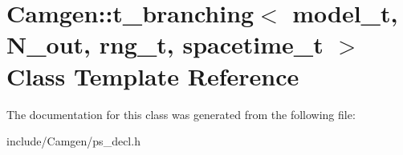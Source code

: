 \hypertarget{a00523}{\section{Camgen\-:\-:t\-\_\-branching$<$ model\-\_\-t, N\-\_\-out, rng\-\_\-t, spacetime\-\_\-t $>$ Class Template Reference}
\label{a00523}
}


The documentation for this class was generated from the following file\-:\begin{DoxyCompactItemize}
\item 
include/\-Camgen/ps\-\_\-decl.\-h\end{DoxyCompactItemize}
